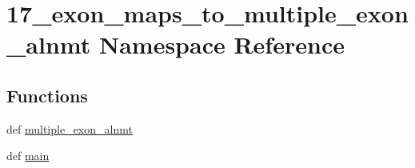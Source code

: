 \hypertarget{namespace17__exon__maps__to__multiple__exon__alnmt}{\section{17\-\_\-exon\-\_\-maps\-\_\-to\-\_\-multiple\-\_\-exon\-\_\-alnmt Namespace Reference}
\label{namespace17__exon__maps__to__multiple__exon__alnmt}
}
\subsection*{Functions}
\begin{DoxyCompactItemize}
\item 
def \hyperlink{namespace17__exon__maps__to__multiple__exon__alnmt_a735b903e9ea328a1645594a1708c9d4c}{multiple\-\_\-exon\-\_\-alnmt}
\item 
def \hyperlink{namespace17__exon__maps__to__multiple__exon__alnmt_ad0668e8a22c74fa788c270537ce4cda3}{main}
\end{DoxyCompactItemize}


